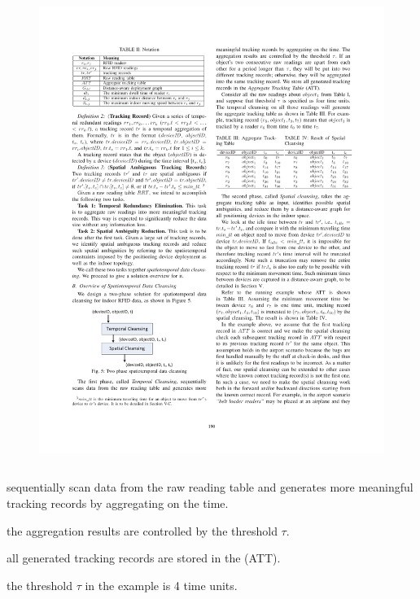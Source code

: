 \begin{frame}
\begin{columns}[c]
  \begin{figure}[tb]
    \includegraphics[width=\columnwidth]{figures/3-2/3-2-5.pdf}
  \end{figure}

\end{columns}

\vspace{15pt}
\begin{sitemize}
  \item sequentially scan data from the raw reading table and generates more meaningful tracking records by aggregating on the time.
  \item the aggregation results are controlled by the threshold $\tau$.
  \item all generated tracking records are stored in the  (ATT).
  \item the threshold $\tau$ in the example is 4 time units.
\end{sitemize}

\end{frame}


